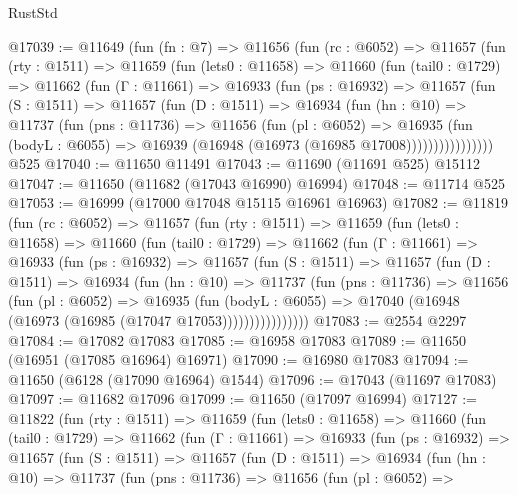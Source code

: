 \begin{lexlean}{RustStd}
\begin{coremodule}
@17039 := @11649
    (fun (fn : @7) =>
    @11656
      (fun (rc : @6052) =>
      @11657
        (fun (rty : @1511) =>
        @11659
          (fun (lets0 : @11658) =>
          @11660
            (fun (tail0 : @1729) =>
            @11662
              (fun (Γ : @11661) =>
              @16933
                (fun (ps : @16932) =>
                @11657
                  (fun (S : @1511) =>
                  @11657
                    (fun (D : @1511) =>
                    @16934
                      (fun (hn : @10) =>
                      @11737
                        (fun (pns : @11736) =>
                        @11656
                          (fun (pl : @6052) =>
                          @16935
                            (fun (bodyL : @6055) =>
                            @16939 (@16948 (@16973 (@16985 @17008))))))))))))))))
    @525
@17040 := @11650 @11491
@17043 := @11690 (@11691 @525) @15112
@17047 := @11650 (@11682 (@17043 @16990) @16994)
@17048 := @11714 @525
@17053 := @16999 (@17000 @17048 @15115 @16961 @16963)
@17082 := @11819
    (fun (rc : @6052) =>
    @11657
      (fun (rty : @1511) =>
      @11659
        (fun (lets0 : @11658) =>
        @11660
          (fun (tail0 : @1729) =>
          @11662
            (fun (Γ : @11661) =>
            @16933
              (fun (ps : @16932) =>
              @11657
                (fun (S : @1511) =>
                @11657
                  (fun (D : @1511) =>
                  @16934
                    (fun (hn : @10) =>
                    @11737
                      (fun (pns : @11736) =>
                      @11656
                        (fun (pl : @6052) =>
                        @16935
                          (fun (bodyL : @6055) =>
                          @17040 (@16948 (@16973 (@16985 (@17047 @17053))))))))))))))))
@17083 := @2554 @2297
@17084 := @17082 @17083
@17085 := @16958 @17083
@17089 := @11650 (@16951 (@17085 @16964) @16971)
@17090 := @16980 @17083
@17094 := @11650 (@6128 (@17090 @16964) @1544)
@17096 := @17043 (@11697 @17083)
@17097 := @11682 @17096
@17099 := @11650 (@17097 @16994)
@17127 := @11822
    (fun (rty : @1511) =>
    @11659
      (fun (lets0 : @11658) =>
      @11660
        (fun (tail0 : @1729) =>
        @11662
          (fun (Γ : @11661) =>
          @16933
            (fun (ps : @16932) =>
            @11657
              (fun (S : @1511) =>
              @11657
                (fun (D : @1511) =>
                @16934
                  (fun (hn : @10) =>
                  @11737
                    (fun (pns : @11736) =>
                    @11656
                      (fun (pl : @6052) =>

\end{coremodule}
\end{lexlean}

